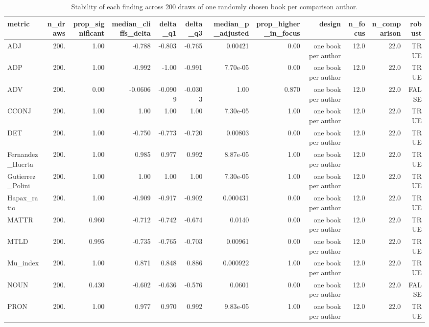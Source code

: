 \begin{table}[htbp]
\centering
\small
\caption{Stability of each finding across 200 draws of one randomly chosen book per comparison author.}
\label{tab:sensitivity-author}
\begin{tabular}{lrrrrrrrrrrr}
\toprule
\textbf{metric} & \textbf{n\_draws} & \textbf{prop\_significant} & \textbf{median\_cliffs\_delta} & \textbf{delta\_q1} & \textbf{delta\_q3} & \textbf{median\_p\_adjusted} & \textbf{prop\_higher\_in\_focus} & \textbf{design} & \textbf{n\_focus} & \textbf{n\_comparison} & \textbf{robust} \\
\midrule
ADJ & 200. & 1.00 & -0.788 & -0.803 & -0.765 & 0.00421 & 0.00 & one book per author & 12.0 & 22.0 & TRUE \\
ADP & 200. & 1.00 & -0.992 & -1.00 & -0.991 & 7.70e-05 & 0.00 & one book per author & 12.0 & 22.0 & TRUE \\
ADV & 200. & 0.00 & -0.0606 & -0.0909 & -0.0303 & 1.00 & 0.870 & one book per author & 12.0 & 22.0 & FALSE \\
CCONJ & 200. & 1.00 & 1.00 & 1.00 & 1.00 & 7.30e-05 & 1.00 & one book per author & 12.0 & 22.0 & TRUE \\
DET & 200. & 1.00 & -0.750 & -0.773 & -0.720 & 0.00803 & 0.00 & one book per author & 12.0 & 22.0 & TRUE \\
Fernandez\_Huerta & 200. & 1.00 & 0.985 & 0.977 & 0.992 & 8.87e-05 & 1.00 & one book per author & 12.0 & 22.0 & TRUE \\
Gutierrez\_Polini & 200. & 1.00 & 1.00 & 1.00 & 1.00 & 7.30e-05 & 1.00 & one book per author & 12.0 & 22.0 & TRUE \\
Hapax\_ratio & 200. & 1.00 & -0.909 & -0.917 & -0.902 & 0.000431 & 0.00 & one book per author & 12.0 & 22.0 & TRUE \\
MATTR & 200. & 0.960 & -0.712 & -0.742 & -0.674 & 0.0140 & 0.00 & one book per author & 12.0 & 22.0 & TRUE \\
MTLD & 200. & 0.995 & -0.735 & -0.765 & -0.703 & 0.00961 & 0.00 & one book per author & 12.0 & 22.0 & TRUE \\
Mu\_index & 200. & 1.00 & 0.871 & 0.848 & 0.886 & 0.000922 & 1.00 & one book per author & 12.0 & 22.0 & TRUE \\
NOUN & 200. & 0.430 & -0.602 & -0.636 & -0.576 & 0.0601 & 0.00 & one book per author & 12.0 & 22.0 & FALSE \\
PRON & 200. & 1.00 & 0.977 & 0.970 & 0.992 & 9.83e-05 & 1.00 & one book per author & 12.0 & 22.0 & TRUE \\

\end{tabular}
\end{table}
